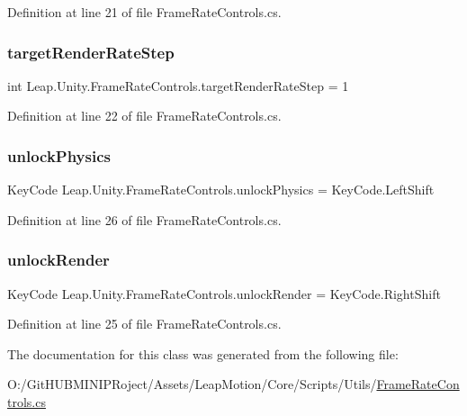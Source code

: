 Definition at line 21 of file Frame\+Rate\+Controls.\+cs.

\mbox{\label{class_leap_1_1_unity_1_1_frame_rate_controls_a7cf289769d60fe1077b5ba8f24b7ad3f}} 
\subsubsection{\texorpdfstring{targetRenderRateStep}{targetRenderRateStep}}
{\footnotesize\ttfamily int Leap.\+Unity.\+Frame\+Rate\+Controls.\+target\+Render\+Rate\+Step = 1}



Definition at line 22 of file Frame\+Rate\+Controls.\+cs.

\mbox{\label{class_leap_1_1_unity_1_1_frame_rate_controls_a0d1ab1f9d0a8b8735e13117e66ab0f1d}} 
\subsubsection{\texorpdfstring{unlockPhysics}{unlockPhysics}}
{\footnotesize\ttfamily Key\+Code Leap.\+Unity.\+Frame\+Rate\+Controls.\+unlock\+Physics = Key\+Code.\+Left\+Shift}



Definition at line 26 of file Frame\+Rate\+Controls.\+cs.

\mbox{\label{class_leap_1_1_unity_1_1_frame_rate_controls_a694da099202f1f4a86c3358e26208305}} 
\subsubsection{\texorpdfstring{unlockRender}{unlockRender}}
{\footnotesize\ttfamily Key\+Code Leap.\+Unity.\+Frame\+Rate\+Controls.\+unlock\+Render = Key\+Code.\+Right\+Shift}



Definition at line 25 of file Frame\+Rate\+Controls.\+cs.



The documentation for this class was generated from the following file\+:\begin{DoxyCompactItemize}
\item 
O\+:/\+Git\+H\+U\+B\+M\+I\+N\+I\+P\+Roject/\+Assets/\+Leap\+Motion/\+Core/\+Scripts/\+Utils/\mbox{\hyperlink{_frame_rate_controls_8cs}{Frame\+Rate\+Controls.\+cs}}\end{DoxyCompactItemize}
